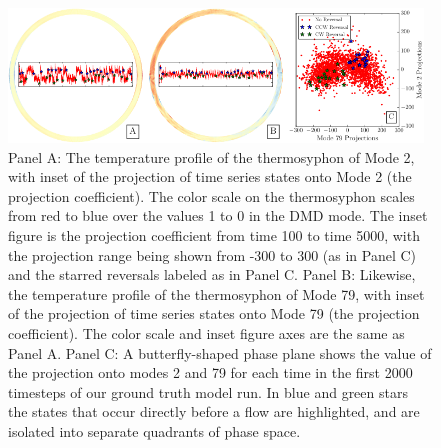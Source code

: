 \begin{figure}
  \centering
  \includegraphics[width=0.98\textwidth]{../combined-phase-potrait-2-79-python.pdf}
  \caption[]{
    Panel A: The temperature profile of the thermosyphon of Mode 2, with inset of the projection of time series states onto Mode 2 (the projection coefficient).
    The color scale on the thermosyphon scales from red to blue over the values 1 to 0 in the DMD mode.
    The inset figure is the projection coefficient from time 100 to time 5000, with the projection range being shown from -300 to 300 (as in Panel C) and the starred reversals labeled as in Panel C.
    Panel B: Likewise, the temperature profile of the thermosyphon of Mode 79, with inset of the projection of time series states onto Mode 79 (the projection coefficient).
    The color scale and inset figure axes are the same as Panel A.
    Panel C: A butterfly-shaped phase plane shows the value of the projection onto modes 2 and 79 for each time in the first 2000 timesteps of our ground truth model run.
    In blue and green stars the states that occur directly before a flow are highlighted, and are isolated into separate quadrants of phase space.
  }
  \label{fig:DMD_phaseplane}
\end{figure}

